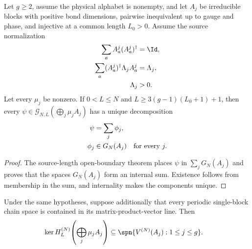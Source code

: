 \begin{lemma}
    \label{thm:block_diagonal_chain_unique_decomposition_source_length}
    \leanok
    Let $g\ge2$, assume the physical alphabet is nonempty, and let $A_j$
    be irreducible blocks with positive bond dimensions, pairwise inequivalent
    up to gauge and phase, and injective at a common
    length $L_0>0$. Assume the source normalization
    \begin{align}
        \sum_aA^j_a(A^j_a)^\dagger          & =\Id,
        \notag                                            \\
        \sum_a(A^j_a)^\dagger\Lambda_jA^j_a & =\Lambda_j,
        \notag                                            \\
        \Lambda_j                           & >0.
        \notag
    \end{align}
    Let every $\mu_j$ be nonzero. If $0<L\le N$ and
    $L\ge3(g-1)(L_0+1)+1$, then every
    $\psi\in\mathcal G_{N,L}(\bigoplus_j\mu_jA_j)$ has a unique decomposition
    \begin{align}
        \psi   & =\sum_j\phi_j,
        \notag                  \\
        \phi_j & \in G_N(A_j)
        \quad\text{for every }j.
        \notag
    \end{align}
\end{lemma}

\begin{proof}\leanok
    The source-length open-boundary theorem places $\psi$ in
    $\sum_jG_N(A_j)$ and proves that the spaces $G_N(A_j)$ form an internal
    sum. Existence follows from membership in the sum, and internality makes
    the components unique.
\end{proof}

\begin{corollary}
    \label{cor:block_diagonal_kernel_global_cut}
    \leanok
    Under the same hypotheses, suppose additionally that every periodic
    single-block chain space is contained in its matrix-product-vector line.
    Then
    \begin{align}
        \ker H_L^{(N)}\!\left(\bigoplus_j\mu_jA_j\right)
         & \subseteq
        \spn\{V^{(N)}(A_j):1\le j\le g\}.
        \notag
    \end{align}
\end{corollary}

